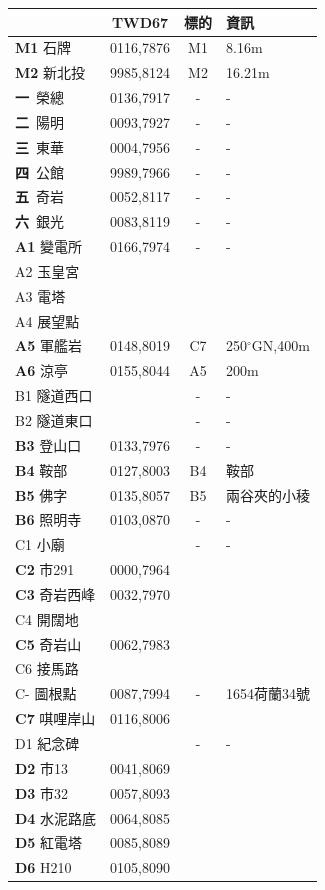 \documentclass{article}
\begin{document}
\begin{CJK*}{UTF8}{bkai}
\begin{multicols}{2}
\begin{tabular}{|l|c|c|l|}
	\hline
	&TWD67&標的&資訊\\  
	\hline
	\textbf{M1} 石牌&0116,7876&M1&8.16m\\
	\textbf{M2} 新北投&9985,8124&M2&16.21m\\
	\hline
	\textbf{一}\ 榮總&0136,7917&-&-\\
	\textbf{二}\ 陽明&0093,7927&-&-\\
	\textbf{三}\ 東華&0004,7956&-&-\\
	\textbf{四}\ 公館&9989,7966&-&-\\
	\textbf{五}\ 奇岩&0052,8117&-&-\\
	\textbf{六}\ 銀光&0083,8119&-&-\\
	\hline
	\textbf{A1} 變電所&0166,7974&-&-\\
	A2 玉皇宮& & &\\
	A3 電塔& & &\\
	A4 展望點& & &\\
	\textbf{A5} 軍艦岩&0148,8019&C7&250$^{\circ}$GN,400m\\
	\textbf{A6} 涼亭&0155,8044&A5&200m\\
	\hline
	B1 隧道西口& &-&-\\
	B2 隧道東口& &-&-\\
	\textbf{B3} 登山口&0133,7976&-&-\\
	\textbf{B4} 鞍部&0127,8003&B4&鞍部\\
	\textbf{B5} 佛字&0135,8057&B5&兩谷夾的小稜\\
	\textbf{B6} 照明寺&0103,0870&-&-\\
	\hline
	C1 小廟& &-&-\\
	\textbf{C2} 市291&0000,7964& &\\
	\textbf{C3} 奇岩西峰&0032,7970& &\\
	C4 開闊地& & &\\
	\textbf{C5} 奇岩山&0062,7983& &\\
	C6 接馬路& & &\\
	C- 圖根點&0087,7994&-&1654荷蘭34號\\
	\textbf{C7} 唭哩岸山&0116,8006&&\\
	\hline
	D1 紀念碑& &-&-\\
	\textbf{D2} 市13&0041,8069& &\\
	\textbf{D3} 市32&0057,8093& &\\
	\textbf{D4} 水泥路底&0064,8085& &\\
	\textbf{D5} 紅電塔&0085,8089& &\\
	\textbf{D6} H210&0105,8090& &\\

\end{tabular}
\end{multicols}
\end{CJK*}
\end{document}
